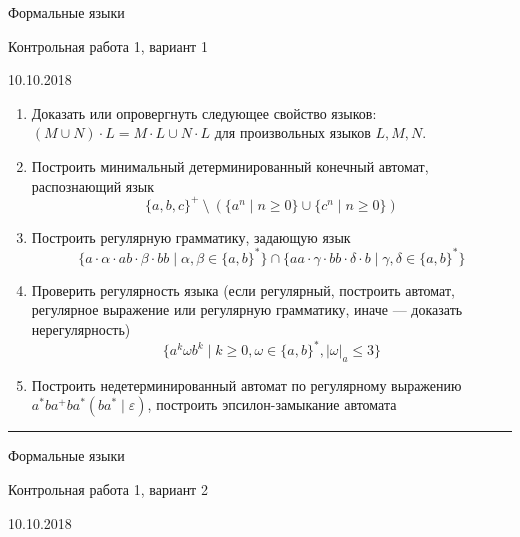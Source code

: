 \documentclass[12pt]{article}
\begin{document}
\begin{center} 
{\LARGE Формальные языки}

{\Large Контрольная работа 1, вариант 1}

{\large 10.10.2018}
\end{center}

\bigskip

\begin{enumerate}
  \item Доказать или опровергнуть следующее свойство языков: $( M \cup N ) \cdot L = M \cdot L \cup N \cdot L $ для произвольных языков $L, M, N$.
  
  \item Построить минимальный детерминированный конечный автомат, распознающий язык  \[ \{ a,b,c \}^+ \ \setminus \ ( \{a^n \mid n \geq 0\} \cup \{c^n \mid n \geq 0\})\]
  

  \item Построить регулярную грамматику, задающую язык \[\{ a \cdot \alpha \cdot a b \cdot \beta \cdot b b \mid \alpha, \beta \in \{ a, b \}^* \} \cap \{a a \cdot \gamma \cdot b b \cdot \delta \cdot b \mid \gamma, \delta \in \{a, b\}^* \} \]
  \item Проверить регулярность языка (если регулярный, построить автомат, регулярное выражение или регулярную грамматику, иначе --- доказать нерегулярность) 
  \[ \{ a^k \omega b^k \mid k \geq 0, \omega \in \{a,b\}^*,|\omega|_a \leq 3 \} \]
  \item {Построить недетерминированный автомат по регулярному выражению $ a^* b a^+ b a^* (b a^* \mid \varepsilon) $, построить эпсилон-замыкание автомата }
\end{enumerate}

\vspace{1cm}

\rule{\textwidth}{1pt}

\vspace{1cm}

\begin{center}
{\LARGE Формальные языки}

{\Large Контрольная работа 1, вариант 2}

{\large 10.10.2018}
\end{center}
\bigskip
\end{document}
